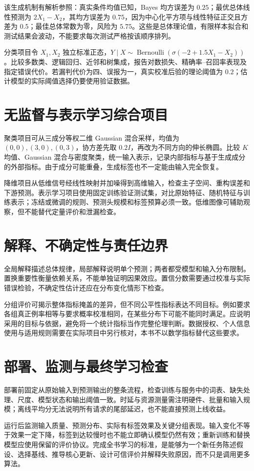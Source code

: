 该生成机制有解析参照：真实条件均值已知，Bayes 均方误差为 $0.25$；最优总体线性预测为 $2X_1-X_2$，其均方误差为 $0.75$，因为中心化平方项与线性特征正交且方差为 $0.5$；最佳总体常数为零，风险为 $5.75$。这些是总体理论值，有限样本拟合和测试结果会波动，不能要求每次测试严格按该顺序排列。

分类项目令 $X_1,X_2$ 独立标准正态，$Y\mid X\sim\operatorname{Bernoulli}(\sigma(-2+1.5X_1-X_2))$。比较多数类、逻辑回归、近邻和树集成，报告对数损失、精确率--召回率表现及指定错误代价。若漏判代价为四、误报为一，真实校准后验的理论阈值为 $0.2$；估计模型的实际阈值选择仍要使用验证数据。

\section{无监督与表示学习综合项目}

聚类项目可从三成分等权二维 Gaussian 混合采样，均值为 $(0,0),(3,0),(0,3)$，协方差先取 $0.2I$，再改为不同方向的伸长椭圆。比较 $K$ 均值、Gaussian 混合与密度聚类，统一输入表示，记录内部指标与基于生成成分的外部指标。由于成分可能重叠，生成标签也不一定能由输入完全恢复。

降维项目从低维信号经线性映射并加噪得到高维输入，检查主子空间、重构误差和下游预测。表示学习项目使用固定训练验证测试集，对比原始特征、随机特征与训练表示；冻结或微调的规则、预测头规模和标签预算必须一致。低维图像可辅助观察，但不能替代定量评价和泄漏检查。

\section{解释、不确定性与责任边界}

全局解释描述总体规律，局部解释说明单个预测；两者都受模型和输入分布限制。置换重要性衡量依赖关系，不能单独证明因果效应。置信分数需要通过校准与实际错误检验，不确定性估计还应在分布变化情形下检查。

分组评价可揭示整体指标掩盖的差异，但不同公平性指标表达不同目标。例如要求各组真正例率相等与要求概率校准相同，在某些分布下可能不能同时满足。应说明采用的目标与依据，避免将一个统计指标当作完整伦理判断。数据授权、个人信息使用与适用规则需要在实际项目中另行核对，本书不以数学指标替代这些要求。

\section{部署、监测与最终学习检查}

部署前固定从原始输入到预测输出的整条流程，检查训练与服务中的词表、缺失处理、尺度、模型状态和输出阈值一致。时延与资源测量需注明硬件、批量和输入规模；离线平均分无法说明所有请求的尾部延迟，也不能直接预测上线收益。

运行后监测输入质量、预测分布、实际有标签效果及关键分组表现。输入变化不等于效果一定下降，标签到达较慢时也不能立即确认模型仍然有效；重新训练和替换模型应使用保留的评价协议。完成全书学习的标准，是能够为一个新任务陈述假设、选择基线、推导核心更新、设计可信评价并解释失败原因，而不只是调用更多算法。



